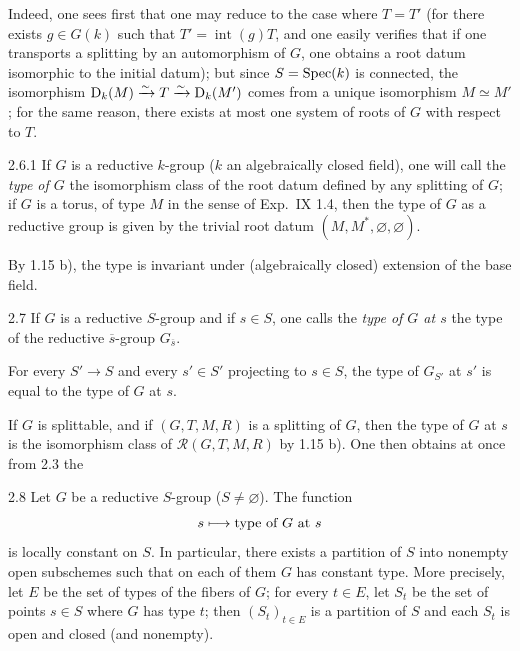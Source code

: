 Indeed, one sees first that one may reduce to the case where $T=T'$ (for there exists $g\in G(k)$ such that $T'=\operatorname{int}(g)T$, and one easily verifies that if one transports a splitting by an automorphism of $G$, one obtains a root datum isomorphic to the initial datum); but since $S=\operatorname{Spec}(k)$ is connected, the isomorphism $\mathrm D_k(M)\xrightarrow{\sim} T\xrightarrow{\sim}\mathrm D_k(M')$ comes from a unique isomorphism $M\simeq M'$; for the same reason, there exists at most one system of roots of $G$ with respect to $T$.
\begin{definition}{2.6.1}\label{XXII.2.6.1}
{\renewcommand{\thefootnote}{(4)}}%
If $G$ is a reductive $k$-group ($k$ an algebraically closed field), one will call the \emph{type of $G$} the isomorphism class of the root datum defined by any splitting of $G$; if $G$ is a torus, of type $M$ in the sense of Exp.~IX 1.4, then the type of $G$ as a reductive group is given by the trivial root datum $(M,M^*,\varnothing,\varnothing)$.
\end{definition}
By 1.15 b){\renewcommand{\thefootnote}{(5)}}, the type is invariant under (algebraically closed) extension of the base field.
\begin{definition}{2.7}\label{XXII.2.7}
If $G$ is a reductive $S$-group and if $s\in S$, one calls the \emph{type of $G$ at $s$} the type of the reductive $\overline s$-group $G_{\overline s}$.

For every $S'\to S$ and every $s'\in S'$ projecting to $s\in S$, the type of $G_{S'}$ at $s'$ is equal to the type of $G$ at $s$.

If $G$ is splittable, and if $(G,T,M,R)$ is a splitting of $G$, then the type of $G$ at $s$ is the isomorphism class of $\mathscr R(G,T,M,R)$ by 1.15 b){\renewcommand{\thefootnote}{(5)}\footnotemark[6]}. One then obtains at once from 2.3 the
\end{definition}
\begin{proposition}{2.8}\label{XXII.2.8}
Let $G$ be a reductive $S$-group ($S\ne\varnothing$). The function
\[
s\longmapsto\text{type of $G$ at $s$}
\]
is locally constant on $S$. In particular, there exists a partition of $S$ into nonempty open subschemes such that on each of them $G$ has constant type. More precisely, let $E$ be the set of types of the fibers of $G$; for every $t\in E$, let $S_t$ be the set of points $s\in S$ where $G$ has type $t$; then $(S_t)_{t\in E}$ is a partition of $S$ and each $S_t$ is open and closed (and nonempty).
\end{proposition}


